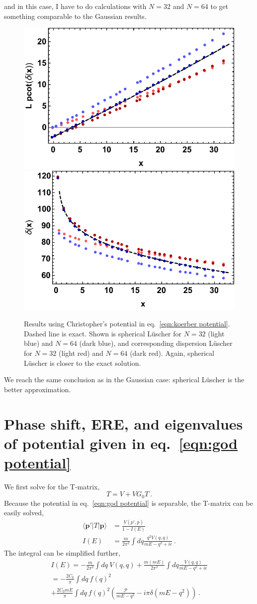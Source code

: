 \documentclass[11pt]{article}
\begin{document}
and in this case, I have to do calculations with $N=32$ and $N=64$ to get something comparable to the Gaussian results.
\begin{figure}
\includegraphics[width=.5\textwidth]{figs/pcotd_3S1_koerber.pdf}\includegraphics[width=.5\textwidth]{figs/delta_3S1_koerber.pdf}
\caption{Results using Christopher's potential in eq.~\eqref{eqn:koerber potential}.  Dashed line is exact.  Shown is spherical L\"uscher for $N=32$ (light blue) and $N=64$ (dark blue), and corresponding dispersion L\"uscher for $N=32$ (light red) and $N=64$ (dark red). Again, spherical L\"uscher is closer to the exact solution. \label{fig:3s1 koerber} }
\end{figure}
We reach the same conclusion as in the Gaussian case:  spherical L\"uscher is the better approximation.  

\appendix
\section{Phase shift, ERE, and eigenvalues of potential given in eq.~\eqref{eqn:god potential}\label{sect:god potential}}
We first solve for the T-matrix,
\begin{displaymath}
T = V+VG_0 T\ .
\end{displaymath}
Because the potential in eq.~\eqref{eqn:god potential} is separable, the T-matrix can be easily solved,
\begin{align}
\langle \bm p'|T|\bm p\rangle &= \frac{V(p',p)}{1-I(E)}\label{eqn:T-matrix solution}\\
I(E)&=\frac{m}{2\pi^2}\int dq\frac{q^2V(q,q)}{mE-q^2+i\epsilon}\ .
\end{align}
The integral can be simplified further,
\begin{multline}
I(E)=-\frac{m}{2\pi^2}\int dq\ V(q,q)+\frac{m(mE)}{2\pi^2}\int dq\frac{V(q,q)}{mE-q^2+i\epsilon}\\
=-\frac{2C_0}{\pi}\int dq\  f(q)^2\\
+\frac{2C_0 mE}{\pi}\int dq\ f(q)^2\left(\frac{\mathcal{P}}{mE-q^2}-i\pi \delta(mE-q^2)\right)
\ .
\end{multline}
\end{document}
